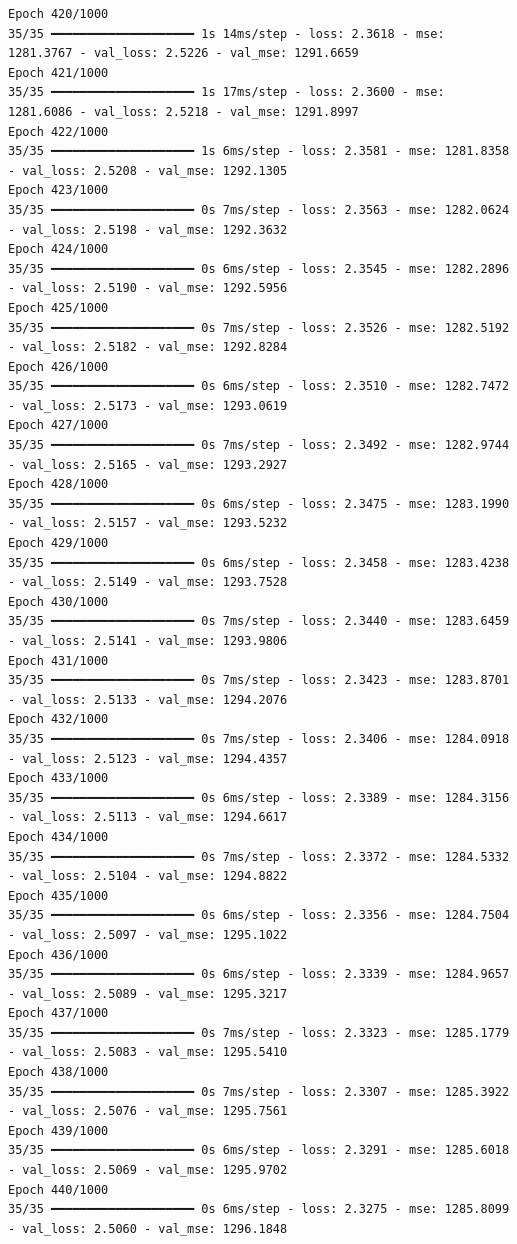 \documentclass[
  letterpaper,
  DIV=11,
  numbers=noendperiod]{scrreprt}
\begin{document}
\begin{verbatim}
Epoch 420/1000
35/35 ━━━━━━━━━━━━━━━━━━━━ 1s 14ms/step - loss: 2.3618 - mse: 1281.3767 - val_loss: 2.5226 - val_mse: 1291.6659
Epoch 421/1000
35/35 ━━━━━━━━━━━━━━━━━━━━ 1s 17ms/step - loss: 2.3600 - mse: 1281.6086 - val_loss: 2.5218 - val_mse: 1291.8997
Epoch 422/1000
35/35 ━━━━━━━━━━━━━━━━━━━━ 1s 6ms/step - loss: 2.3581 - mse: 1281.8358 - val_loss: 2.5208 - val_mse: 1292.1305
Epoch 423/1000
35/35 ━━━━━━━━━━━━━━━━━━━━ 0s 7ms/step - loss: 2.3563 - mse: 1282.0624 - val_loss: 2.5198 - val_mse: 1292.3632
Epoch 424/1000
35/35 ━━━━━━━━━━━━━━━━━━━━ 0s 6ms/step - loss: 2.3545 - mse: 1282.2896 - val_loss: 2.5190 - val_mse: 1292.5956
Epoch 425/1000
35/35 ━━━━━━━━━━━━━━━━━━━━ 0s 7ms/step - loss: 2.3526 - mse: 1282.5192 - val_loss: 2.5182 - val_mse: 1292.8284
Epoch 426/1000
35/35 ━━━━━━━━━━━━━━━━━━━━ 0s 6ms/step - loss: 2.3510 - mse: 1282.7472 - val_loss: 2.5173 - val_mse: 1293.0619
Epoch 427/1000
35/35 ━━━━━━━━━━━━━━━━━━━━ 0s 7ms/step - loss: 2.3492 - mse: 1282.9744 - val_loss: 2.5165 - val_mse: 1293.2927
Epoch 428/1000
35/35 ━━━━━━━━━━━━━━━━━━━━ 0s 6ms/step - loss: 2.3475 - mse: 1283.1990 - val_loss: 2.5157 - val_mse: 1293.5232
Epoch 429/1000
35/35 ━━━━━━━━━━━━━━━━━━━━ 0s 6ms/step - loss: 2.3458 - mse: 1283.4238 - val_loss: 2.5149 - val_mse: 1293.7528
Epoch 430/1000
35/35 ━━━━━━━━━━━━━━━━━━━━ 0s 7ms/step - loss: 2.3440 - mse: 1283.6459 - val_loss: 2.5141 - val_mse: 1293.9806
Epoch 431/1000
35/35 ━━━━━━━━━━━━━━━━━━━━ 0s 7ms/step - loss: 2.3423 - mse: 1283.8701 - val_loss: 2.5133 - val_mse: 1294.2076
Epoch 432/1000
35/35 ━━━━━━━━━━━━━━━━━━━━ 0s 7ms/step - loss: 2.3406 - mse: 1284.0918 - val_loss: 2.5123 - val_mse: 1294.4357
Epoch 433/1000
35/35 ━━━━━━━━━━━━━━━━━━━━ 0s 6ms/step - loss: 2.3389 - mse: 1284.3156 - val_loss: 2.5113 - val_mse: 1294.6617
Epoch 434/1000
35/35 ━━━━━━━━━━━━━━━━━━━━ 0s 7ms/step - loss: 2.3372 - mse: 1284.5332 - val_loss: 2.5104 - val_mse: 1294.8822
Epoch 435/1000
35/35 ━━━━━━━━━━━━━━━━━━━━ 0s 6ms/step - loss: 2.3356 - mse: 1284.7504 - val_loss: 2.5097 - val_mse: 1295.1022
Epoch 436/1000
35/35 ━━━━━━━━━━━━━━━━━━━━ 0s 6ms/step - loss: 2.3339 - mse: 1284.9657 - val_loss: 2.5089 - val_mse: 1295.3217
Epoch 437/1000
35/35 ━━━━━━━━━━━━━━━━━━━━ 0s 7ms/step - loss: 2.3323 - mse: 1285.1779 - val_loss: 2.5083 - val_mse: 1295.5410
Epoch 438/1000
35/35 ━━━━━━━━━━━━━━━━━━━━ 0s 7ms/step - loss: 2.3307 - mse: 1285.3922 - val_loss: 2.5076 - val_mse: 1295.7561
Epoch 439/1000
35/35 ━━━━━━━━━━━━━━━━━━━━ 0s 6ms/step - loss: 2.3291 - mse: 1285.6018 - val_loss: 2.5069 - val_mse: 1295.9702
Epoch 440/1000
35/35 ━━━━━━━━━━━━━━━━━━━━ 0s 6ms/step - loss: 2.3275 - mse: 1285.8099 - val_loss: 2.5060 - val_mse: 1296.1848

\end{verbatim}
\end{document}

